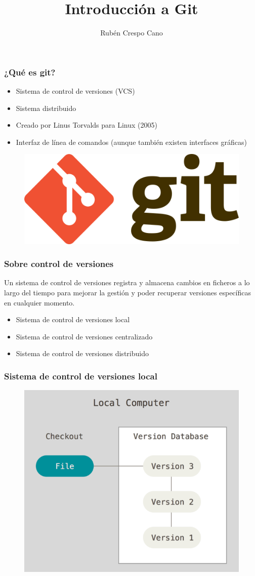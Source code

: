 \documentclass{beamer}
\title[Introducción a Git]{Introducción a Git}
\author{Rubén Crespo Cano}
\institute[]
{
{\color{gray}\textit{@rcrespocano}}
}
\date{}
\begin{document}
\begin{frame}
\titlepage
\end{frame}

\begin{frame}
\frametitle{¿Qué es git?}
\begin{itemize}
\item Sistema de control de versiones (VCS)
\item Sistema distribuido
\item Creado por Linus Torvalds para Linux (2005)
\item Interfaz de línea de comandos (aunque también existen interfaces gráficas)
\end{itemize}
\vskip 0.25cm
\begin{figure}
\includegraphics[width=0.50\linewidth]{img/gitlogo.png}
\end{figure}
\end{frame}

\begin{frame}
\frametitle{Sobre control de versiones}
Un sistema de control de versiones registra y almacena cambios en ficheros a lo largo del tiempo para mejorar la gestión y poder recuperar versiones específicas en cualquier momento.
\vskip 0.50cm
\begin{itemize}
\item Sistema de control de versiones local
\item Sistema de control de versiones centralizado
\item Sistema de control de versiones distribuido
\end{itemize}
\end{frame}

\begin{frame}
\frametitle{Sistema de control de versiones local}
\begin{figure}
\includegraphics[width=0.50\linewidth]{img/local.png}
\end{figure}
\end{frame}
\end{document}

